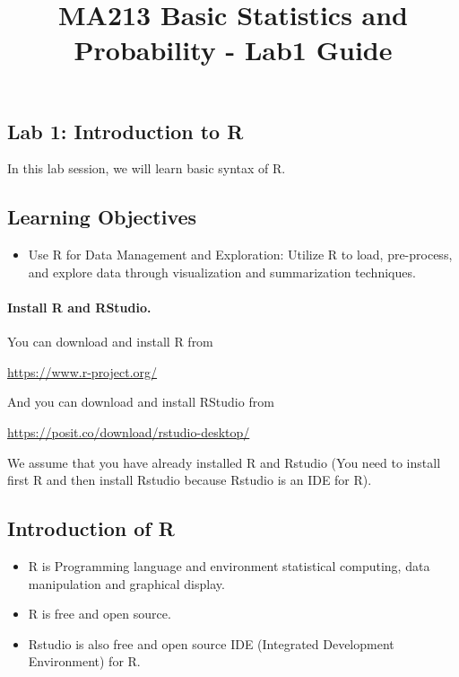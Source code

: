 \documentclass[
]{article}
\title{MA213 Basic Statistics and Probability - Lab1 Guide}
\author{}
\date{\vspace{-2.5em}}
\providecommand{\tightlist}{%
  \setlength{\itemsep}{0pt}\setlength{\parskip}{0pt}}
\begin{document}
\maketitle

\subsection{\texorpdfstring{\textbf{Lab 1: Introduction to
R}}{Lab 1: Introduction to R}}\label{lab-1-introduction-to-r}

In this lab session, we will learn basic syntax of R.

\subsection{Learning Objectives}\label{learning-objectives}

\begin{itemize}
\tightlist
\item
  Use R for Data Management and Exploration: Utilize R to load,
  pre-process, and explore data through visualization and summarization
  techniques.
\end{itemize}

\paragraph{Install R and RStudio.}\label{install-r-and-rstudio.}

You can download and install R from

\url{https://www.r-project.org/}

And you can download and install RStudio from

\url{https://posit.co/download/rstudio-desktop/}

We assume that you have already installed R and Rstudio (You need to
install first R and then install Rstudio because Rstudio is an IDE for
R).

\subsection{Introduction of R}\label{introduction-of-r}

\begin{itemize}
\item
  R is Programming language and environment statistical computing, data
  manipulation and graphical display.
\item
  R is free and open source.
\item
  Rstudio is also free and open source IDE (Integrated Development
  Environment) for R.
\end{itemize}
\end{document}

